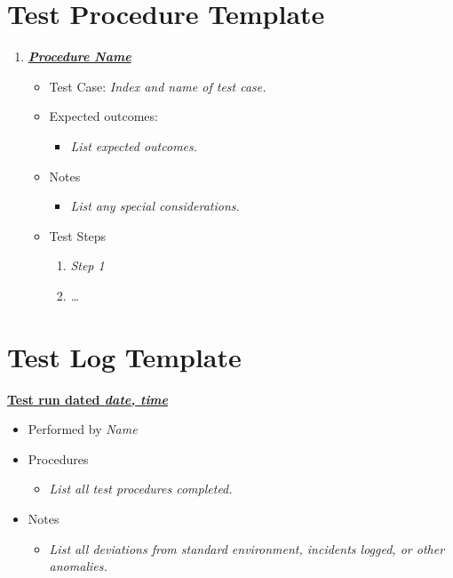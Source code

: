 \documentclass[11pt]{wacomepd}
\begin{document}
\section{Test Procedure Template}
\begin{enumerate}
\item \textbf{\underline{\textit{Procedure Name}}}
  \begin{itemize}
  \item Test Case: \textit{Index and name of test case.}
  \item Expected outcomes:
    \begin{itemize}
    \item \textit{List expected outcomes.}
    \end{itemize}
  \item Notes
    \begin{itemize}
    \item \textit{List any special considerations.}
    \end{itemize}
  \item Test Steps
    \begin{enumerate}[\ensuremath{\square}]
    \item \textit{Step 1}
    \item \textit{\ldots}
    \end{enumerate}
  \end{itemize}
\end{enumerate}


\section{Test Log Template}

\textbf{\underline{Test run dated \textit{date, time}}}

\begin{itemize}
\item Performed by \textit{Name}
\item Procedures
  \begin{itemize}
  \item \textit{List all test procedures completed.}
  \end{itemize}
\item Notes
  \begin{itemize}
  \item \textit{List all deviations from standard environment, incidents logged, or other
    anomalies.}
  \end{itemize}
\end{itemize}
\end{document}
